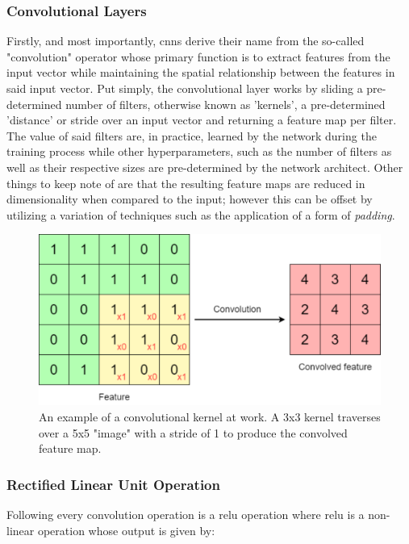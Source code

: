 \subsubsection{Convolutional Layers}
\label{subsubsec:Background-Information:Forecasting-Models:Convolutional-Neural-Networks:Convolutional-Layers}
Firstly, and most importantly, \glspl{cnn} derive their name from the so-called "convolution" operator whose primary function is to extract features from the input vector while maintaining the spatial relationship between the features in said input vector. Put simply, the convolutional layer works by sliding a pre-determined number of filters, otherwise known as 'kernels', a pre-determined 'distance' or stride over an input vector and returning a feature map per filter. The value of said filters are, in practice, learned by the network during the training process while other hyperparameters, such as the number of filters as well as their respective sizes are pre-determined by the network architect. Other things to keep note of are that the resulting feature maps are reduced in dimensionality when compared to the input; however this can be offset by utilizing a variation of techniques such as the application of a form of \textit{padding}.

\begin{figure}[hbt!]
    \centering
    \includegraphics[width=\textwidth]{Images/Chapter 3/CNN/Convolution-Illustration.pdf}
    \caption{An example of a convolutional kernel at work. A 3x3 kernel traverses over a 5x5 "image" with a stride of 1 to produce the convolved feature map.}
    \label{fig:Convolution-Illustration}
\end{figure}

\subsubsection{Rectified Linear Unit Operation}
\label{subsubsec:Background-Information:Forecasting-Models:Convolutional-Neural-Networks:ReLU}
Following every convolution operation is a \gls{relu} operation where \gls{relu} is a non-linear operation whose output is given by:

